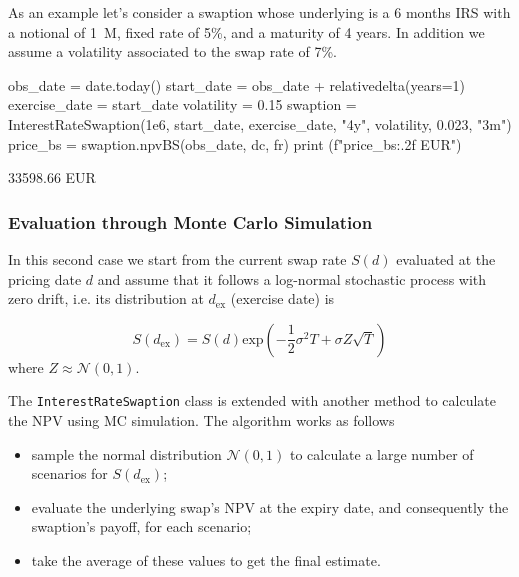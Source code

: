As an example let's consider a swaption whose underlying is a 6 months IRS with a notional of 1~M, fixed rate of 5\%, and a maturity of 4 years. In addition we assume a volatility associated to the swap rate of 7\%.

\begin{ipython}
obs_date = date.today()
start_date = obs_date + relativedelta(years=1)
exercise_date = start_date
volatility = 0.15
swaption = InterestRateSwaption(1e6, start_date, exercise_date, "4y",
                                volatility, 0.023, "3m")
price_bs = swaption.npvBS(obs_date, dc, fr)
print (f"{price_bs:.2f} EUR")
\end{ipython}
\begin{ioutput}
33598.66 EUR
\end{ioutput}

\subsubsection{Evaluation through Monte Carlo Simulation}
\label{evaluation-through-monte-carlo-simulation}

In this second case we start from the current swap rate $S(d)$ evaluated at the pricing date $d$ and assume that it follows a log-normal stochastic process with zero drift, i.e. its distribution at $d_{\mathrm{ex}}$ (exercise date) is 

\begin{equation*}
S(d_{\mathrm{ex}}) = S(d)\mathrm{exp}(-\frac{1}{2}\sigma^{2}T+\sigma Z\sqrt{T})
\end{equation*}
\noindent
where $Z\approx\mathcal{N}(0,1)$. %

\begin{finmarkets}
The \texttt{InterestRateSwaption} class is extended with another method to calculate the NPV using MC simulation.
The algorithm works as follows

\begin{itemize}
\tightlist
\item sample the normal distribution $\mathcal{N}(0, 1)$ to calculate a large number of scenarios for $S(d_{\mathrm{ex}})$;
\item evaluate the underlying swap's NPV at the expiry date, and consequently the swaption's payoff, for each scenario;
\item take the average of these values to get the final estimate.
\end{itemize}
\end{finmarkets}

